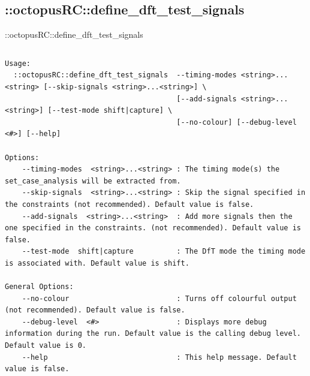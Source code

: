 \documentclass[handout]{beamer}
\begin{document}
\subsection{::octopusRC::define\_dft\_test\_signals}
\begin{frame}{::octopusRC::define\_dft\_test\_signals}
\begin{columns}
\begin{column}{1.1\textwidth}
	\tiny
	\begin{verbatim}
Usage:
  ::octopusRC::define_dft_test_signals  --timing-modes <string>...<string> [--skip-signals <string>...<string>] \
                                        [--add-signals <string>...<string>] [--test-mode shift|capture] \
                                        [--no-colour] [--debug-level <#>] [--help]

Options:
    --timing-modes  <string>...<string> : The timing mode(s) the set_case_analysis will be extracted from.
    --skip-signals  <string>...<string> : Skip the signal specified in the constraints (not recommended). Default value is false.
    --add-signals  <string>...<string>  : Add more signals then the one specified in the constraints. (not recommended). Default value is false.
    --test-mode  shift|capture          : The DfT mode the timing mode is associated with. Default value is shift.

General Options:
    --no-colour                         : Turns off colourful output (not recommended). Default value is false.
    --debug-level  <#>                  : Displays more debug information during the run. Default value is the calling debug level. Default value is 0.
    --help                              : This help message. Default value is false.

	\end{verbatim}
  
\end{column}
\end{columns}
\end{frame}
\end{document}
